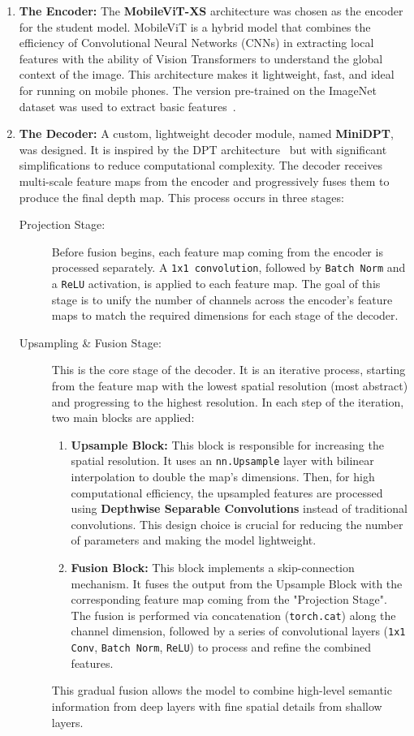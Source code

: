 \begin{enumerate}
    \item \textbf{The Encoder:} The \textbf{MobileViT-XS} architecture was chosen as the encoder for the student model. MobileViT is a hybrid model that combines the efficiency of Convolutional Neural Networks (CNNs) in extracting local features with the ability of Vision Transformers to understand the global context of the image. This architecture makes it lightweight, fast, and ideal for running on mobile phones. The version pre-trained on the ImageNet dataset was used to extract basic features~\cite{mehta2021mobilevit}.

    \item \textbf{The Decoder:} A custom, lightweight decoder module, named \textbf{MiniDPT}, was designed. It is inspired by the DPT architecture~\cite{ranftl2021vision} but with significant simplifications to reduce computational complexity. The decoder receives multi-scale feature maps from the encoder and progressively fuses them to produce the final depth map. This process occurs in three stages:

    \begin{description}
        \item[Projection Stage:] Before fusion begins, each feature map coming from the encoder is processed separately. A \texttt{1x1 convolution}, followed by \texttt{Batch Norm} and a \texttt{ReLU} activation, is applied to each feature map. The goal of this stage is to unify the number of channels across the encoder's feature maps to match the required dimensions for each stage of the decoder.

        \item[Upsampling \& Fusion Stage:] This is the core stage of the decoder. It is an iterative process, starting from the feature map with the lowest spatial resolution (most abstract) and progressing to the highest resolution. In each step of the iteration, two main blocks are applied:
        \begin{enumerate}
            \item \textbf{Upsample Block:} This block is responsible for increasing the spatial resolution. It uses an \texttt{nn.Upsample} layer with bilinear interpolation to double the map's dimensions. Then, for high computational efficiency, the upsampled features are processed using \textbf{Depthwise Separable Convolutions} instead of traditional convolutions. This design choice is crucial for reducing the number of parameters and making the model lightweight.
            \item \textbf{Fusion Block:} This block implements a skip-connection mechanism. It fuses the output from the Upsample Block with the corresponding feature map coming from the "Projection Stage". The fusion is performed via concatenation (\texttt{torch.cat}) along the channel dimension, followed by a series of convolutional layers (\texttt{1x1 Conv}, \texttt{Batch Norm}, \texttt{ReLU}) to process and refine the combined features.
        \end{enumerate}
        This gradual fusion allows the model to combine high-level semantic information from deep layers with fine spatial details from shallow layers.


\end{description}
\end{enumerate}
